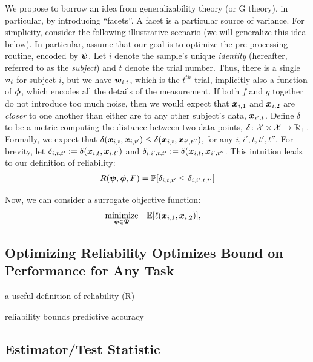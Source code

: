 \documentclass{article}
\begin{document}
We propose to borrow an idea from generalizability theory (or G theory), in particular, by introducing ``facets''.  A facet is a particular source of variance.  For simplicity, consider the following illustrative scenario (we will generalize this idea below). In particular, assume that our goal is to optimize the pre-processing routine, encoded by $\boldsymbol{\psi}$. Let $i$ denote the sample's unique \emph{identity} (hereafter, referred to as the \emph{subject}) and $t$ denote the trial number.  Thus, there is a single $\boldsymbol{v}_i$ for subject $i$, but we have $\boldsymbol{w}_{i,t}$, which is the $t^{th}$ trial, implicitly also a function of $\boldsymbol{\phi}$, which encodes all the details of the measurement.  If both $f$ and $g$ together do not introduce too much noise, then we would expect that $\boldsymbol{x}_{i,1}$ and $\boldsymbol{x}_{i,2}$ are \emph{closer} to one another than either are to any other subject's data, $\boldsymbol{x}_{i',t}$.  Define $\delta$ to be a metric computing the distance between two data points, $\delta {\ensuremath{\colon}} \mathcal{X} \times \mathcal{X} \to \mathbb{R}_+$.  Formally, we expect that $\delta(\boldsymbol{x}_{i,t},\boldsymbol{x}_{i,t'}) \leq \delta(\boldsymbol{x}_{i,t},\boldsymbol{x}_{i',t''})$, for any $i,i',t,t',t''$.  
For brevity, let $\delta_{i,t,t'}:=\delta(\boldsymbol{x}_{i,t}, \boldsymbol{x}_{i,t'})$ and 
$\delta_{i,i',t,t'}:=\delta(\boldsymbol{x}_{i,t}, \boldsymbol{x}_{i',t''}$.  
This intuition leads to our definition of reliability:
\begin{align}
R(\boldsymbol{\psi},\boldsymbol{\phi},F) = \mathbb{P}[ \delta_{i,t,t'} \leq \delta_{i,i',t,t'}]
\end{align}


Now, we can consider a surrogate objective function:
\begin{equation} \label{eq:surroage}
\begin{aligned}
& \underset{\boldsymbol{\psi} \in \boldsymbol{\Psi}}{\text{minimize}}
& & \mathbb{E} [ \ell( \boldsymbol{x}_{i,1}, \boldsymbol{x}_{i,2})],
\end{aligned}
\end{equation}


\subsection{Optimizing Reliability Optimizes Bound on Performance for Any Task}


a useful definition of reliability (R)

\begin{thm}
reliability bounds predictive accuracy
\end{thm}

\subsection{Estimator/Test Statistic}
\end{document}
